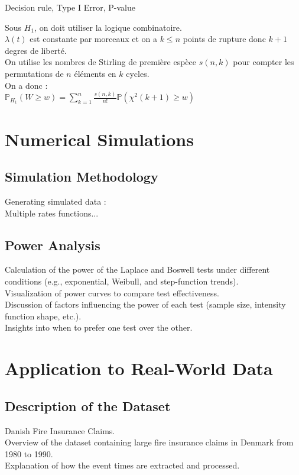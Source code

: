 \documentclass{journalstyle}
\begin{document}
Decision rule, Type I Error, P-value

Sous $H_1$, on doit utiliser la logique combinatoire. \\
$\lambda(t)$ est constante par morceaux et on a $k \leq n$ points de rupture donc $k+1$ degres de liberté. \\
On utilise les nombres de Stirling de première espèce $s(n, k)$ pour compter les permutations de $n$ éléments en $k$ cycles. \\
On a donc : \\
$\mathbb{P}_{H_1}(W \geq w) = \sum_{k=1}^{n} \frac{s(n, k)}{n!} \mathbb{P}(\chi^2(k+1) \geq w)$



\section{Numerical Simulations}

\subsection{Simulation Methodology}

Generating simulated data : \\
Multiple rates functions...

\subsection{Power Analysis}
Calculation of the power of the Laplace and Boswell tests under different conditions (e.g., exponential, Weibull, and step-function trends). \\

Visualization of power curves to compare test effectiveness. \\

Discussion of factors influencing the power of each test (sample size, intensity function shape, etc.). \\

Insights into when to prefer one test over the other.

\section{Application to Real-World Data}

\subsection{Description of the Dataset}
Danish Fire Insurance Claims. \\
Overview of the dataset containing large fire insurance claims in Denmark from 1980 to 1990. \\
Explanation of how the event times are extracted and processed.
\end{document}
